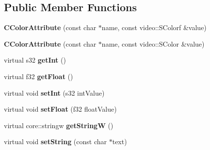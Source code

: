 \subsection*{Public Member Functions}
\begin{DoxyCompactItemize}
\item 
\hypertarget{classirr_1_1io_1_1_c_color_attribute_af8561192fb6a0efb0983c1628602837d}{{\bfseries C\-Color\-Attribute} (const char $\ast$name, const video\-::\-S\-Colorf \&value)}\label{classirr_1_1io_1_1_c_color_attribute_af8561192fb6a0efb0983c1628602837d}

\item 
\hypertarget{classirr_1_1io_1_1_c_color_attribute_a35723f9ac93ba67cd2a4ce862a01757b}{{\bfseries C\-Color\-Attribute} (const char $\ast$name, const video\-::\-S\-Color \&value)}\label{classirr_1_1io_1_1_c_color_attribute_a35723f9ac93ba67cd2a4ce862a01757b}

\item 
\hypertarget{classirr_1_1io_1_1_c_color_attribute_a6d43c521b018cc3eb972fd8b1a51167b}{virtual s32 {\bfseries get\-Int} ()}\label{classirr_1_1io_1_1_c_color_attribute_a6d43c521b018cc3eb972fd8b1a51167b}

\item 
\hypertarget{classirr_1_1io_1_1_c_color_attribute_a1b22fedc1b7d1f8f30050b6008425933}{virtual f32 {\bfseries get\-Float} ()}\label{classirr_1_1io_1_1_c_color_attribute_a1b22fedc1b7d1f8f30050b6008425933}

\item 
\hypertarget{classirr_1_1io_1_1_c_color_attribute_a11d974a687f8635de24e3748de762956}{virtual void {\bfseries set\-Int} (s32 int\-Value)}\label{classirr_1_1io_1_1_c_color_attribute_a11d974a687f8635de24e3748de762956}

\item 
\hypertarget{classirr_1_1io_1_1_c_color_attribute_a351a7638a9c2edf49849da925fc158aa}{virtual void {\bfseries set\-Float} (f32 float\-Value)}\label{classirr_1_1io_1_1_c_color_attribute_a351a7638a9c2edf49849da925fc158aa}

\item 
\hypertarget{classirr_1_1io_1_1_c_color_attribute_aa3ba12e0656d38e2ddc3bdd35a5b4fa1}{virtual core\-::stringw {\bfseries get\-String\-W} ()}\label{classirr_1_1io_1_1_c_color_attribute_aa3ba12e0656d38e2ddc3bdd35a5b4fa1}

\item 
\hypertarget{classirr_1_1io_1_1_c_color_attribute_afc3b3ba87550e2fd9c653f49d859859a}{virtual void {\bfseries set\-String} (const char $\ast$text)}\label{classirr_1_1io_1_1_c_color_attribute_afc3b3ba87550e2fd9c653f49d859859a}


\end{DoxyCompactItemize}
